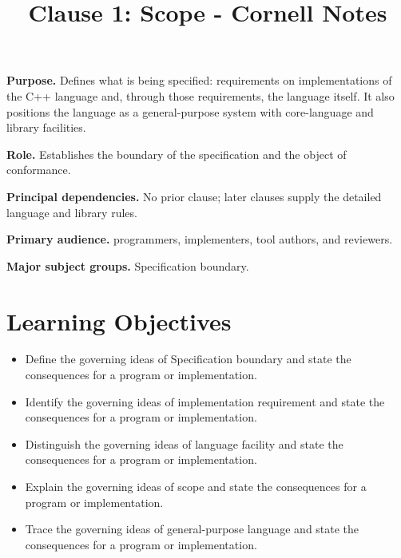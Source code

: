 \documentclass[11pt,letterpaper]{article}
\title{Clause 1: Scope - Cornell Notes}
\author{}
\date{}
\begin{document}
\maketitle
\begin{CornellReferenceOrientationBox}
\textbf{Purpose.} Defines what is being specified: requirements on implementations of the C++ language and, through those requirements, the language itself. It also positions the language as a general-purpose system with core-language and library facilities.
\par\textbf{Role.} Establishes the boundary of the specification and the object of conformance.
\par\textbf{Principal dependencies.} No prior clause; later clauses supply the detailed language and library rules.
\par\textbf{Primary audience.} programmers, implementers, tool authors, and reviewers.
\par\textbf{Major subject groups.} Specification boundary.
\end{CornellReferenceOrientationBox}
\section{Learning Objectives}
\begin{itemize}[label=\textcolor{CornellReferenceTeal}{$\blacktriangleright$}]
\item Define the governing ideas of Specification boundary and state the consequences for a program or implementation.
\item Identify the governing ideas of implementation requirement and state the consequences for a program or implementation.
\item Distinguish the governing ideas of language facility and state the consequences for a program or implementation.
\item Explain the governing ideas of scope and state the consequences for a program or implementation.
\item Trace the governing ideas of general-purpose language and state the consequences for a program or implementation.
\end{itemize}
\end{document}
